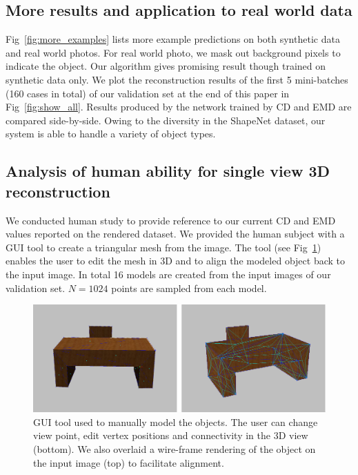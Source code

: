 \subsection{More results and application to real world data}
\label{sec:exp:more}
 
Fig~\ref{fig:more_examples} lists more example predictions on both synthetic data and real world photos. For real world photo, we mask out background pixels to indicate the object. Our algorithm gives promising result though trained on synthetic data only.
We plot the reconstruction results of the first 5 mini-batches (160 cases in total) of our validation set at the end of this paper in Fig~\ref{fig:show_all}. Results produced by the network trained by CD and EMD are compared side-by-side. Owing to the diversity in the ShapeNet dataset, our system is able to handle a variety of object types.



\subsection{Analysis of human ability for single view 3D reconstruction}
We conducted human study to provide reference to our current CD and EMD values reported on the rendered dataset. We provided the human subject with a GUI tool to create a triangular mesh from the image. The tool (see Fig~\ref{fig:gui_tool}) enables the user to edit the mesh in 3D and to align the modeled object back to the input image. In total 16 models are created from the input images of our validation set. $N=1024$ points are sampled from each model.

\begin{figure}
\centering
\includegraphics[width=1.0\linewidth]{./fig/label_tool}
\caption{GUI tool used to manually model the objects. The user can change view point, edit vertex positions and connectivity in the 3D view (bottom). We also overlaid a wire-frame rendering of the object on the input image (top) to facilitate alignment.}
\label{fig:gui_tool}
\end{figure}

